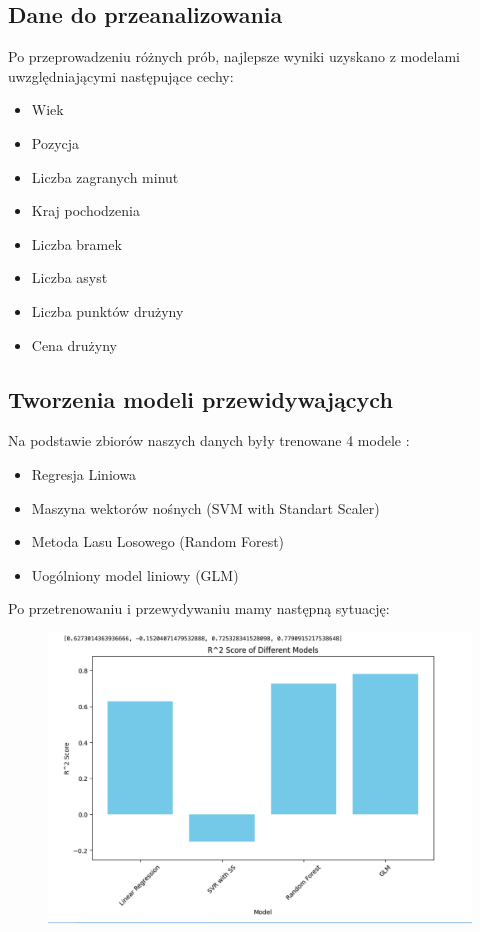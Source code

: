 \documentclass{article}
\begin{document}
\subsection{Dane do przeanalizowania}
Po przeprowadzeniu różnych prób, najlepsze wyniki uzyskano z modelami uwzględniającymi następujące cechy:
\begin{itemize}
    \item Wiek
    \item Pozycja
    \item Liczba zagranych minut
    \item Kraj pochodzenia
    \item Liczba bramek
    \item Liczba asyst
    \item Liczba punktów drużyny
    \item Cena drużyny
\end{itemize}

\subsection{Tworzenia modeli przewidywających}
Na podstawie zbiorów naszych danych były trenowane 4 modele :
\begin{itemize}
    \item Regresja Liniowa
    \item Maszyna wektorów nośnych (SVM with Standart Scaler)
    \item Metoda Lasu Losowego (Random Forest)
    \item Uogólniony model liniowy (GLM)
\end{itemize}
Po przetrenowaniu i przewydywaniu mamy następną sytuację:
\begin{figure}[H] 
    \centering
    \includegraphics[width=\textwidth]{Machines.png}
    
\end{figure}
\end{document}
